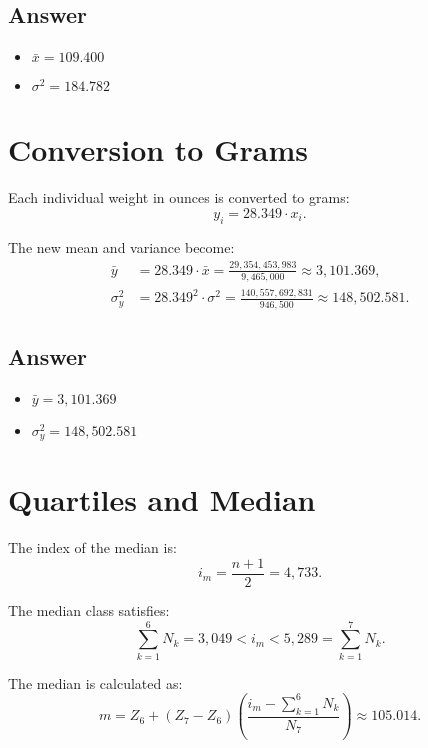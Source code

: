 \documentclass[a4paper,12pt]{article}
\begin{document}
\subsection*{Answer}
\begin{itemize}
    \item $\bar{x} = 109.400$
    \item $\sigma^2 = 184.782$
\end{itemize}

\section{Conversion to Grams}
Each individual weight in ounces is converted to grams:
\begin{equation}
y_i = 28.349 \cdot x_i.
\end{equation}

The new mean and variance become:
\begin{align}
\bar{y} &= 28.349 \cdot \bar{x} = \frac{29,354,453,983}{9,465,000} \approx 3,101.369, \\
\sigma_y^2 &= 28.349^2 \cdot \sigma^2 = \frac{140,557,692,831}{946,500} \approx 148,502.581.
\end{align}

\subsection*{Answer}
\begin{itemize}
    \item $\bar{y} = 3,101.369$
    \item $\sigma_y^2 = 148,502.581$
\end{itemize}

\section{Quartiles and Median}
The index of the median is:
\begin{equation}
i_m = \frac{n+1}{2} = 4,733.
\end{equation}

The median class satisfies:
\begin{equation}
\sum_{k=1}^{6} N_k = 3,049 < i_m < 5,289 = \sum_{k=1}^{7} N_k.
\end{equation}

The median is calculated as:
\begin{equation}
m = Z_6 + (Z_7 - Z_6) \left( \frac{i_m - \sum_{k=1}^{6} N_k}{N_7} \right) \approx 105.014.
\end{equation}
\end{document}
